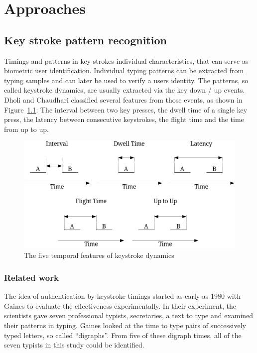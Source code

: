 \chapter{Approaches}\label{chapter:approaches}

\section{Key stroke pattern recognition}
Timings and patterns in key strokes individual characteristics, that can serve as biometric user identification. Individual typing patterns can be extracted from typing samples and can later be used to verify a users identity. The patterns, so called keystroke dynamics, are usually extracted via the key down / up events. Dholi and Chaudhari\cite{dholi2013typing} classified several features from those events, as shown in Figure~\ref{fig:keystrokeFeatures}: The interval between two key presses, the dwell time of a single key press, the latency between consecutive keystrokes, the flight time and the time from up to up.

\begin{figure}
    \centering
    \includegraphics[width=\linewidth]{figures/KeystrokeTemporalFeatures.png}
    \caption{The five temporal features of keystroke dynamics\cite{dholi2013typing}}
    \label{fig:keystrokeFeatures}
\end{figure}
\subsection{Related work}
The idea of authentication by keystroke timings started as early as 1980 with Gaines \etal\cite{gaines1980authentication} to evaluate the effectiveness experimentally. In their experiment, the scientists gave seven professional typists, \ie secretaries, a text to type and examined their patterns in typing. Gaines \etal looked at the time to type pairs of successively typed letters, so called ``digraphs''. From five of these digraph times, all of the seven typists in this study could be identified.


